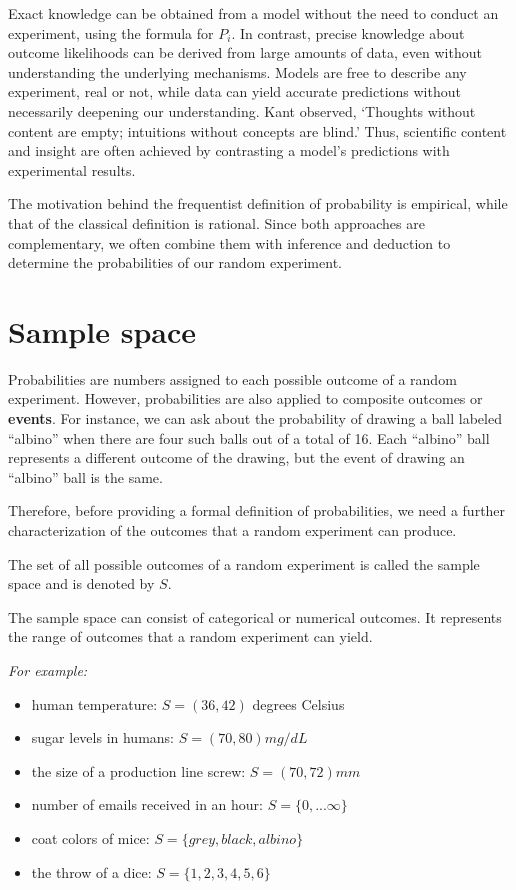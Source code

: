 \documentclass[
]{book}
\providecommand{\tightlist}{%
  \setlength{\itemsep}{0pt}\setlength{\parskip}{0pt}}
\begin{document}
Exact knowledge can be obtained from a model without the need to conduct an experiment, using the formula for \(P_i\). In contrast, precise knowledge about outcome likelihoods can be derived from large amounts of data, even without understanding the underlying mechanisms. Models are free to describe any experiment, real or not, while data can yield accurate predictions without necessarily deepening our understanding. Kant observed, `Thoughts without content are empty; intuitions without concepts are blind.' Thus, scientific content and insight are often achieved by contrasting a model's predictions with experimental results.

The motivation behind the frequentist definition of probability is empirical, while that of the classical definition is rational. Since both approaches are complementary, we often combine them with inference and deduction to determine the probabilities of our random experiment.

\hypertarget{sample-space}{%
\section{Sample space}\label{sample-space}}

Probabilities are numbers assigned to each possible outcome of a random experiment. However, probabilities are also applied to composite outcomes or \textbf{events}. For instance, we can ask about the probability of drawing a ball labeled ``albino'' when there are four such balls out of a total of 16. Each ``albino'' ball represents a different outcome of the drawing, but the event of drawing an ``albino'' ball is the same.

Therefore, before providing a formal definition of probabilities, we need a further characterization of the outcomes that a random experiment can produce.

The set of all possible outcomes of a random experiment is called the sample space and is denoted by \(S\).

The sample space can consist of categorical or numerical outcomes. It represents the range of outcomes that a random experiment can yield.

\emph{For example:}

\begin{itemize}
\tightlist
\item
  human temperature: \(S = (36, 42)\) degrees Celsius
\item
  sugar levels in humans: \(S =( 70,80) mg/ dL\)
\item
  the size of a production line screw: \(S =(70,72) mm\)
\item
  number of emails received in an hour: \(S = \{0, ...\infty \}\)
\item
  coat colors of mice: \(S= \{grey, black, albino\}\)
\item
  the throw of a dice: \(S= \{ 1, 2, 3, 4, 5, 6\}\)
\end{itemize}
\end{document}
